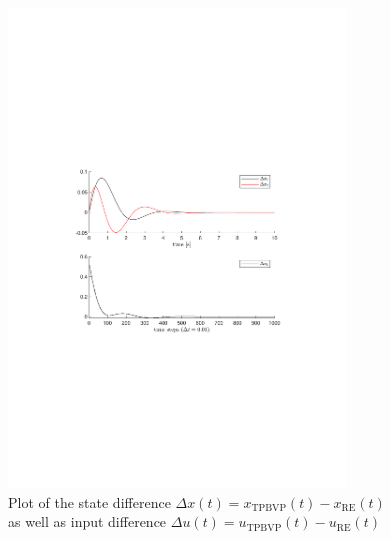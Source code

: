 \begin{figure}[h]
    \centering
    \includegraphics[width=0.8\textwidth]{3_2.pdf}
    \caption{Plot of the state difference $\Delta x(t) = x_{\textrm{TPBVP}}(t) - x_{\textrm{RE}}(t)$\\as well as input difference $\Delta u(t) = u_{\textrm{TPBVP}}(t) - u_{\textrm{RE}}(t)$}
\end{figure}